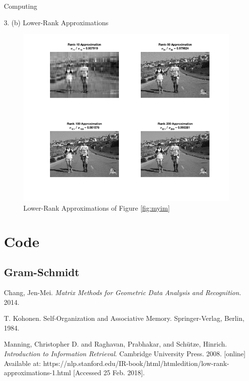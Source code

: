 \begin{section}{Computing}
\begin{homeworkSection}{3. (b) Lower-Rank Approximations}
\begin{figure}[H]
\centering
\includegraphics[width=0.9999\columnwidth]{../data/lower_rank_approxs}
\caption{Lower-Rank Approximations of Figure \ref{fig:myim}}
\label{fig:rank_approxs}
\end{figure}


\end{homeworkSection}

\end{section}


\newpage

\appendix

\section{Code}\label{code}

\subsection{Gram-Schmidt} \label{code:gram_schmidt}




\begin{thebibliography}{10}
    Chang, Jen-Mei. \textit{Matrix Methods for Geometric Data Analysis and Recognition}. 2014.

    T. Kohonen. Self-Organization and Associative Memory. Springer-Verlag, Berlin, 1984.

    Manning, Christopher D. and Raghavan, Prabhakar, and Schütze, Hinrich.
    \textit{Introduction to Information Retrieval}. Cambridge University Press. 2008. 
    [online] Available at: https://nlp.stanford.edu/IR-book/html/htmledition/low-rank-approximations-1.html [Accessed 25 Feb. 2018].

\end{thebibliography}


